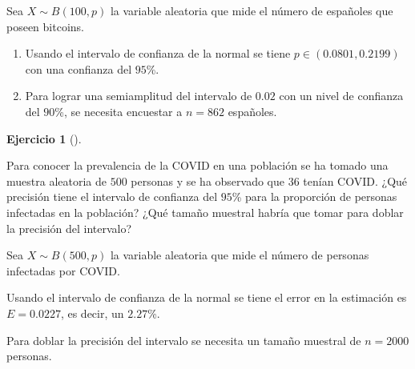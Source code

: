 \documentclass[
  spanish,
  a4paper,
]{scrreport}
\theoremstyle{definition}
\newtheorem{exercise}{Ejercicio}[chapter]
\theoremstyle{remark}
\begin{document}
\begin{tcolorbox}[enhanced jigsaw, arc=.35mm, bottomrule=.15mm, bottomtitle=1mm, breakable, colback=white, colbacktitle=quarto-callout-tip-color!10!white, colframe=quarto-callout-tip-color-frame, coltitle=black, left=2mm, leftrule=.75mm, opacityback=0, opacitybacktitle=0.6, rightrule=.15mm, title=\textcolor{quarto-callout-tip-color}{\faLightbulb}\hspace{0.5em}{Solución}, titlerule=0mm, toprule=.15mm, toptitle=1mm]

Sea \(X\sim B(100, p)\) la variable aleatoria que mide el número de
españoles que poseen bitcoins.

\begin{enumerate}
\def\labelenumi{\alph{enumi}.}
\item
  Usando el intervalo de confianza de la normal se tiene
  \(p \in (0.0801, 0.2199)\) con una confianza del \(95\)\%.
\item
  Para lograr una semiamplitud del intervalo de \(0.02\) con un nivel de
  confianza del \(90\)\%, se necesita encuestar a \(n=862\) españoles.
\end{enumerate}

\end{tcolorbox}

\begin{exercise}[]\protect\hypertarget{exr-intervalo-confianza-proporción-covid}{}\label{exr-intervalo-confianza-proporción-covid}

Para conocer la prevalencia de la COVID en una población se ha tomado
una muestra aleatoria de \(500\) personas y se ha observado que \(36\)
tenían COVID. ¿Qué precisión tiene el intervalo de confianza del
\(95\)\% para la proporción de personas infectadas en la población? ¿Qué
tamaño muestral habría que tomar para doblar la precisión del intervalo?

\end{exercise}

\begin{tcolorbox}[enhanced jigsaw, arc=.35mm, bottomrule=.15mm, bottomtitle=1mm, breakable, colback=white, colbacktitle=quarto-callout-tip-color!10!white, colframe=quarto-callout-tip-color-frame, coltitle=black, left=2mm, leftrule=.75mm, opacityback=0, opacitybacktitle=0.6, rightrule=.15mm, title=\textcolor{quarto-callout-tip-color}{\faLightbulb}\hspace{0.5em}{Solución}, titlerule=0mm, toprule=.15mm, toptitle=1mm]

Sea \(X\sim B(500, p)\) la variable aleatoria que mide el número de
personas infectadas por COVID.

Usando el intervalo de confianza de la normal se tiene el error en la
estimación es \(E = 0.0227\), es decir, un \(2.27\)\%.

Para doblar la precisión del intervalo se necesita un tamaño muestral de
\(n=2000\) personas.

\end{tcolorbox}
\end{document}
